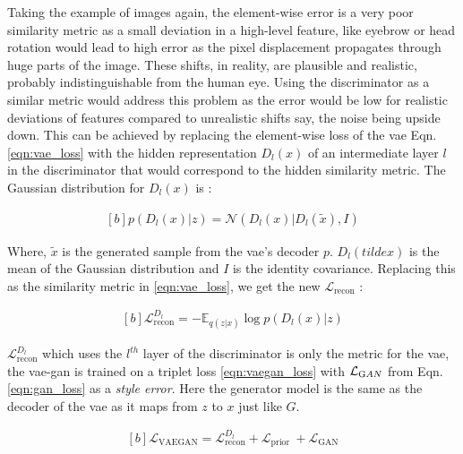 Taking the example of images again, the element-wise error is a very poor similarity metric as a small deviation in a high-level feature, like eyebrow or head rotation would lead to high error as the pixel displacement propagates through huge parts of the image. These shifts, in reality, are plausible and realistic, probably indistinguishable from the human eye. Using the discriminator as a similar metric would address this problem as the error would be low for realistic deviations of features compared to unrealistic shifts say, the noise being upside down. This can be achieved by replacing the element-wise loss of the \ac{vae} Eqn. \ref{eqn:vae_loss} with the hidden representation $D_{l}(x)$ of an intermediate layer $l$ in the discriminator that would correspond to the hidden similarity metric. The Gaussian distribution for $D_{l}(x)$ is :
    
\begin{equation} \label{eqn:gan_similarity}
    \begin{aligned}[b]
        p\left(D_{l}(x) | z\right)=\mathcal{N}\left(D_{l}(x) | D_{l}(\tilde{x}), I\right)
    \end{aligned}
\end{equation}

Where, $\tilde{x}$ is the generated sample from the \ac{vae}'s decoder $p$. $D_{l}(tilde{x})$ is the mean of the Gaussian distribution and $I$ is the identity covariance. Replacing this as the similarity metric in \ref{eqn:vae_loss}, we get the new $\mathcal{L}_{\text {recon}}$ :

\begin{equation} \label{eqn:vaegan_recon}
    \begin{gathered}[b]
        \mathcal{L}_{\text {recon}}^{D_{l}}=-\mathbb{E}_{q(z | x)} \log p\left(D_{l}(x) | z\right)
    \end{gathered}
\end{equation}

$\mathcal{L}_{\text {recon}}^{D_{l}}$ which uses the $l^{th}$ layer of the discriminator is only the metric for the \ac{vae}, the \ac{vae}-\ac{gan} is trained on a triplet loss \ref{eqn:vaegan_loss} with $\mathcal{L}_{\text GAN}$ from Eqn. \ref{eqn:gan_loss} as a \textit{style error}. Here the generator model is the same as the decoder of the \ac{vae} as it maps from $z$ to $x$ just like $G$.

\begin{equation} \label{eqn:vaegan_loss}
    \begin{gathered}[b]
    \mathcal{L}_{\mathrm{VAEGAN}} = \mathcal{L}_{\text {recon}}^{D_{l}} +\mathcal{L}_{\text {prior }} + \mathcal{L}_{\text {GAN}}
    \end{gathered}
\end{equation}

